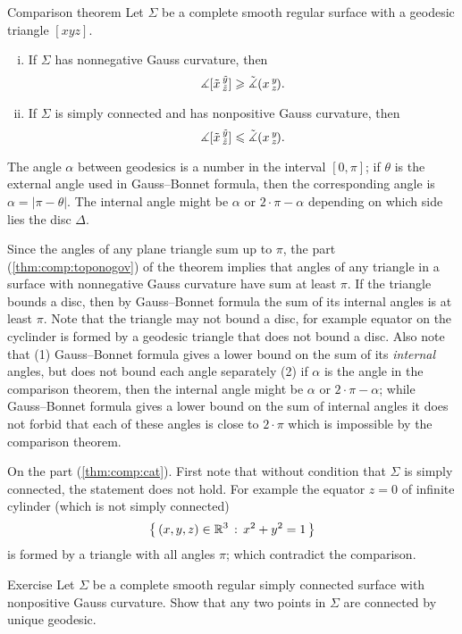 \begin{thm}{Comparison theorem}\label{thm:comp}
Let $\Sigma$ be a complete smooth regular surface with a geodesic triangle $[xyz]$.
\begin{enumerate}[(i)]
 \item\label{thm:comp:toponogov} If $\Sigma$ has nonnegative Gauss curvature, then 
 \[\measuredangle[\tilde x\,{}^{\tilde y}_{\tilde z}]\geqslant\tilde\measuredangle(x\,{}^{y}_{z}\hspace{-0.2ex}).\]
 \item\label{thm:comp:cat} If $\Sigma$ is simply connected and has nonpositive Gauss curvature,
 then 
 \[\measuredangle[\tilde x\,{}^{\tilde y}_{\tilde z}]\leqslant\tilde\measuredangle(x\,{}^{y}_{z}\hspace{-0.2ex}).\]
\end{enumerate}

\end{thm}


The angle $\alpha$ between geodesics is a number in the interval $[0,\pi]$;
if $\theta$ is the external angle used in Gauss--Bonnet formula, then the corresponding angle is $\alpha=|\pi-\theta|$.
The internal angle might be $\alpha$ or $2\cdot\pi-\alpha$ depending on which side lies the disc $\Delta$.

Since the angles of any plane triangle sum up to $\pi$,
the part (\ref{thm:comp:toponogov}) of the theorem implies that angles of any triangle in a surface with nonnegative Gauss curvature have sum at least $\pi$.
If the triangle bounds a disc, then by Gauss--Bonnet formula the sum of its internal angles is at least $\pi$.
Note that the triangle may not bound a disc, for example equator on the cyclinder is formed by a geodesic triangle that does not bound a disc.
Also note that (1) Gauss--Bonnet formula gives a lower bound on the sum of its \emph{internal} angles, but does not bound each angle separately (2) if $\alpha$ is the angle in the comparison theorem, then the internal angle might be $\alpha$ or $2\cdot\pi-\alpha$; while Gauss--Bonnet formula gives a lower bound on the sum of internal angles it does not forbid that each of these angles is close to $2\cdot \pi$ which is impossible by the comparison theorem.

On the part (\ref{thm:comp:cat}).
First note that without condition that $\Sigma$ is simply connected, the statement does not hold.
For example the equator $z=0$ of infinite cylinder (which is not simply connected)
\[\left\{\,{(x,y,z)\in\mathbb{R}^3}\,:\,{x^2+y^2=1}\,\right\}\]
is formed by a triangle with all angles $\pi$; which contradict the comparison.

\begin{thm}{Exercise}
Let $\Sigma$ be a complete smooth regular simply connected surface with nonpositive Gauss curvature.
Show that any two points in $\Sigma$ are connected by unique geodesic.
\end{thm}


